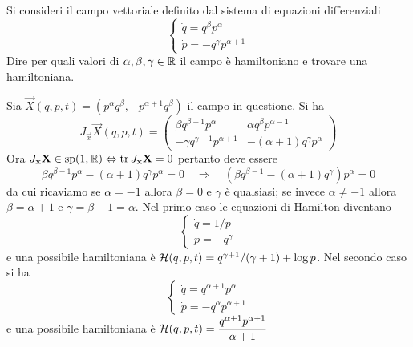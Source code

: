 \begin{exercise}
    Si consideri il campo vettoriale definito dal sistema di equazioni differenziali
    \[
        \begin{cases}
            \dot{q} = q^{\beta} p^\alpha \\
            \dot{p} = - q^{\gamma} p^{\alpha+1}
        \end{cases}
    \]
    Dire per quali valori di $ \alpha, \beta, \gamma \in \mathbb{R} $ il campo è hamiltoniano e trovare una hamiltoniana.
\end{exercise}
\begin{solution}
    Sia $ \vec{X}(q, p, t) = (p^\alpha q^\beta, -p^{\alpha+1}q^{\beta}) $ il campo in questione. Si ha
    \[
        J_\vec{x} \vec{X} (q, p, t) =
        \begin{pmatrix}
            \beta q^{\beta-1} p^{\alpha} & \alpha q^{\beta} p^{\alpha-1} \\
            - \gamma q^{\gamma-1} p^{\alpha+1} & - (\alpha+1) q^{\gamma} p^{\alpha}
        \end{pmatrix}
    \]
    Ora $ J_{\mathbf{x}} \mathbf{X} \in \mathrm{sp}(1, \mathbb{R}) \Leftrightarrow \operatorname{tr}{J_{\mathbf{x}} \mathbf{X}} = 0 $ pertanto deve essere
    \[
        \beta q^{\beta-1} p^{\alpha} - (\alpha+1) q^{\gamma} p^{\alpha} = 0 \quad \Rightarrow \quad \left(\beta q^{\beta-1} - (\alpha+1) q^{\gamma}\right) p^{\alpha} = 0
    \]
    da cui ricaviamo se $ \alpha = -1 $ allora $ \beta = 0 $ e $ \gamma $ è qualsiasi; se invece $ \alpha \neq -1 $ allora $ \beta = \alpha+1 $ e $ \gamma = \beta - 1 = \alpha $. Nel primo caso le equazioni di Hamilton diventano
    \[
        \begin{cases}
            \dot{q} = 1/p \\
            \dot{p} = -q^{\gamma}
        \end{cases}
    \]
    e una possibile hamiltoniana è $ \mathcal{H} (q, p, t) = q^{\gamma+1}/(\gamma+1) + \log{p} $. Nel secondo caso si ha
    \[
        \begin{cases}
            \dot{q} = q^{\alpha+1} p^\alpha  \\
            \dot{p} = - q^{\alpha} p^{\alpha+1}
        \end{cases}
    \]
    e una possibile hamiltoniana è $ \mathcal{H}(q, p, t) = \dfrac{q^{\alpha+1}p^{\alpha+1}}{\alpha+1} $
\end{solution}


